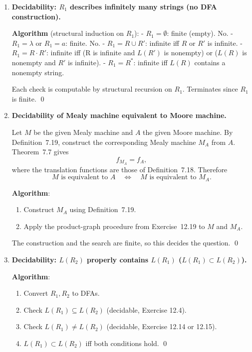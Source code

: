 \begin{enumerate}[{12.}1. ]
\item \textbf{Decidability: $R_1$ describes infinitely many strings (no DFA construction).}

\textbf{Algorithm} (structural induction on $R_1$):
- $R_1 = \pmb{\emptyset}$: finite (empty). No.
- $R_1 = \lambda$ or $R_1 = a$: finite. No.
- $R_1 = R \cup R'$: infinite iff $R$ or $R'$ is infinite.
- $R_1 = R\cdot R'$: infinite iff (R is infinite and $L(R')$ is nonempty) or ($L(R)$ is nonempty and $R'$ is infinite).
- $R_1 = R^*$: infinite iff $L(R)$ contains a nonempty string.

Each check is computable by structural recursion on $R_1$. Terminates since $R_1$ is finite. \qed

\item \textbf{Decidability of Mealy machine equivalent to Moore machine.}

Let $M$ be the given Mealy machine and $A$ the given Moore machine. By
Definition~7.19, construct the corresponding Mealy machine $M_A$ from $A$.
Theorem~7.7 gives
\[
f_{M_A}=f_A,
\]
where the translation functions are those of Definition~7.18.
Therefore
\[
M\text{ is equivalent to }A
\quad\Longleftrightarrow\quad
M\text{ is equivalent to }M_A.
\]

\textbf{Algorithm}:
\begin{enumerate}
\item Construct $M_A$ using Definition~7.19.
\item Apply the product-graph procedure from Exercise~12.19 to $M$ and $M_A$.
\end{enumerate}
The construction and the search are finite, so this decides the question.
\qed

\item \textbf{Decidability: $L(R_2)$ properly contains $L(R_1)$ ($L(R_1)\subset L(R_2)$).}

\textbf{Algorithm}:
\begin{enumerate}
\item Convert $R_1, R_2$ to DFAs.
\item Check $L(R_1)\subseteq L(R_2)$ (decidable, Exercise 12.4).
\item Check $L(R_1)\neq L(R_2)$ (decidable, Exercise 12.14 or 12.15).
\item $L(R_1)\subset L(R_2)$ iff both conditions hold. \qed
\end{enumerate}


\end{enumerate}
